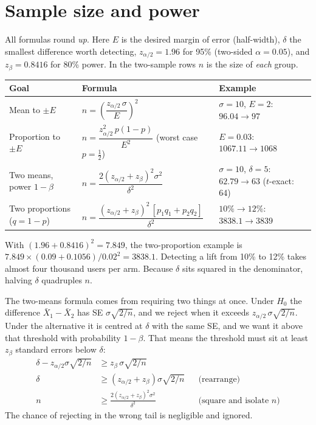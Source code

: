\section{Sample size and power}

All formulas round \emph{up}. Here $E$ is the desired margin of error (half-width), $\delta$ the smallest difference worth detecting, $z_{\alpha/2}=1.96$ for 95\% (two-sided $\alpha=0.05$), and $z_{\beta} = 0.8416$ for 80\% power. In the two-sample rows $n$ is the size of \emph{each} group.

\begin{center}
\small
\renewcommand{\arraystretch}{1.5}
\begin{tabular}{@{}p{3.2cm}p{6.4cm}p{5.0cm}@{}}
\toprule
Goal & Formula & Example \\
\midrule
Mean to $\pm E$ & $n=\left(\dfrac{z_{\alpha/2}\,\sigma}{E}\right)^2$ & $\sigma=10$, $E=2$: $96.04\to 97$ \\
Proportion to $\pm E$ & $n=\dfrac{z_{\alpha/2}^2\,p(1-p)}{E^2}$ (worst case $p=\tfrac12$) & $E=0.03$: $1067.11\to 1068$ \\
Two means, power $1-\beta$ & $n=\dfrac{2(z_{\alpha/2}+z_{\beta})^2\sigma^2}{\delta^2}$ & $\sigma=10$, $\delta=5$: $62.79\to 63$ ($t$-exact: 64) \\
Two proportions ($q=1-p$) & $n=\dfrac{(z_{\alpha/2}+z_{\beta})^2\,[p_1q_1+p_2q_2]}{\delta^2}$ & $10\%\to12\%$: $3838.1\to 3839$ \\
\bottomrule
\end{tabular}
\end{center}

With $(1.96+0.8416)^2=7.849$, the two-proportion example is $7.849\times(0.09+0.1056)/0.02^2=3838.1$. Detecting a lift from 10\% to 12\% takes almost four thousand users per arm. Because $\delta$ sits squared in the denominator, halving $\delta$ quadruples $n$.

\begin{whybox}
The two-means formula comes from requiring two things at once. Under $H_0$ the difference $\bar X_1-\bar X_2$ has SE $\sigma\sqrt{2/n}$, and we reject when it exceeds $z_{\alpha/2}\,\sigma\sqrt{2/n}$. Under the alternative it is centred at $\delta$ with the same SE, and we want it above that threshold with probability $1-\beta$. That means the threshold must sit at least $z_{\beta}$ standard errors below $\delta$:
\begin{align*}
  \delta - z_{\alpha/2}\sigma\sqrt{2/n} &\ge z_{\beta}\,\sigma\sqrt{2/n} \\
  \delta &\ge (z_{\alpha/2} + z_{\beta})\sigma\sqrt{2/n} &&\text{(rearrange)} \\
  n &\ge \frac{2(z_{\alpha/2}+z_{\beta})^2\sigma^2}{\delta^2} &&\text{(square and isolate $n$)}
\end{align*}
The chance of rejecting in the wrong tail is negligible and ignored.
\end{whybox}

